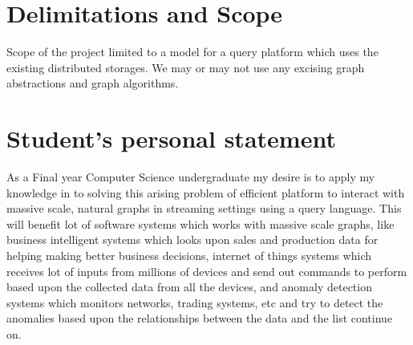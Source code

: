 \documentclass[12pt]{article}
\begin{document}
\section{Delimitations and Scope}
Scope of the project limited to a model for a query platform which uses the existing distributed storages. We may or may not use any excising graph abstractions and graph algorithms.

\clearpage 
\section{Student’s personal statement} 
As a Final year Computer Science undergraduate my desire is to apply my knowledge in to solving this arising problem of efficient platform to interact with massive scale, natural graphs in streaming settings using a query language. This will benefit lot of software systems which works with massive scale graphs, like business intelligent systems which looks upon sales and production data for helping making better business decisions, internet of things systems which receives lot of inputs from millions of devices and send out commands to perform based upon the collected data from all the devices, and anomaly detection systems which monitors networks, trading systems, etc and try to detect the anomalies based upon the relationships between the data and the list continue on.  

\clearpage 
\end{document}
